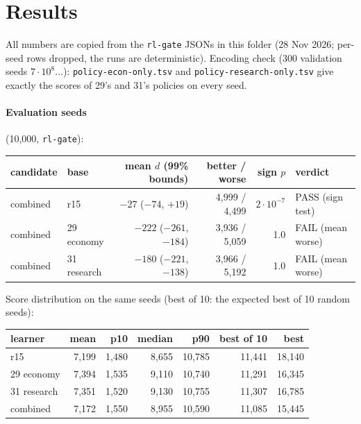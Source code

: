 \documentclass{../polyexp}
\begin{document}
\section{Results}
\ExpResults

All numbers are copied from the \texttt{rl-gate} JSONs in this folder (28 Nov 2026; per-seed rows dropped, the runs are
deterministic). Encoding check (300 validation seeds $7\cdot10^8\dots$): \texttt{policy-econ-only.tsv} and
\texttt{policy-research-only.tsv} give exactly the scores of 29's and 31's policies on every seed.

\paragraph{Evaluation seeds} (10{,}000, \texttt{rl-gate}):

\begin{center}\small
\begin{tabular}{llrrrl}
\toprule
candidate & base & mean $d$ (99\% bounds) & better / worse & sign $p$ & verdict \\
\midrule
combined & r15         & $-27$ ($-74$, $+19$)    & 4{,}999 / 4{,}499 & $2\cdot10^{-7}$ & PASS (sign test) \\
combined & 29 economy  & $-222$ ($-261$, $-184$) & 3{,}936 / 5{,}059 & 1.0 & FAIL (mean worse) \\
combined & 31 research & $-180$ ($-221$, $-138$) & 3{,}966 / 5{,}192 & 1.0 & FAIL (mean worse) \\
\bottomrule
\end{tabular}
\end{center}

Score distribution on the same seeds (best of 10: the expected best of 10 random seeds):

\begin{center}\small
\begin{tabular}{lrrrrrr}
\toprule
learner & mean & p10 & median & p90 & best of 10 & best \\
\midrule
r15                  & 7{,}199 & 1{,}480 & 8{,}655 & 10{,}785 & 11{,}441 & 18{,}140 \\
29 economy           & 7{,}394 & 1{,}535 & 9{,}110 & 10{,}740 & 11{,}291 & 16{,}345 \\
31 research          & 7{,}351 & 1{,}520 & 9{,}130 & 10{,}755 & 11{,}307 & 16{,}785 \\
combined             & 7{,}172 & 1{,}550 & 8{,}955 & 10{,}590 & 11{,}085 & 15{,}445 \\
\bottomrule
\end{tabular}
\end{center}
\end{document}

